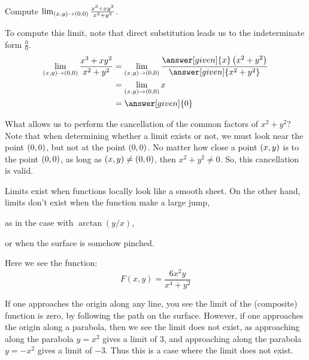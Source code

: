 \documentclass{ximera}
\begin{document}
\begin{example}
  Compute $\lim_{\left(x,y\right)\to\left(0,0\right)} \frac{x^3+xy^2}{x^2+y^2}$. 
  \begin{explanation}
   To compute this limit, note that direct substitution leads us to the indeterminate form $\frac{0}{0}$.      
    \begin{align*}
      \lim_{\point{x,y}\to\point{0,0}}\frac{x^3+xy^2}{x^2+y^2}
      &=\lim_{\point{x,y}\to\point{0,0}} \frac{\answer[given]{x}\left(x^2+y^2\right)}{\answer[given]{x^2+y^2}}\\
      &=\lim_{\point{x,y}\to\point{0,0}} x\\
      &=\answer[given]{0}
    \end{align*}
    
    What allows us to perform the cancellation of the common factors of $x^2+y^2$?  Note that when determining whether a limit exists or not, we must look near the point $\left(0,0\right)$, but not at the point $\left(0,0\right)$.  No matter how close a point  $\left(x,y\right)$ is to the point $\left(0,0\right)$, as long as  $\left(x,y\right) \neq \left(0,0\right)$, then $x^2+y^2 \neq 0$. So, this cancellation is valid.
  \end{explanation}
\end{example}



Limits exist when functions locally look like a smooth sheet. On the
other hand, limits don't exist when the function make a large jump,
\begin{onlineOnly}
  as in the case with $\arctan(y/x)$,
  \begin{center}
  \end{center}
\end{onlineOnly}
or when the surface is somehow pinched.
\begin{onlineOnly}
  Here we see the function:
  \[
  F(x,y) = \frac{6x^2y}{x^4+y^2}
  \]
  \begin{center}
  \end{center}
  If one approaches the origin along any line, you see the limit of
  the (composite) function is zero, by following the path on the
  surface. However, if one approaches the origin along a parabola,
  then we see the limit does not exist, as approaching along the
  parabola $y=x^2$ gives a limit of $3$, and approaching along the
  parabola $y=-x^2$ gives a limit of $-3$. Thus this is a case where
  the limit does not exist.
\end{onlineOnly}
\end{document}
